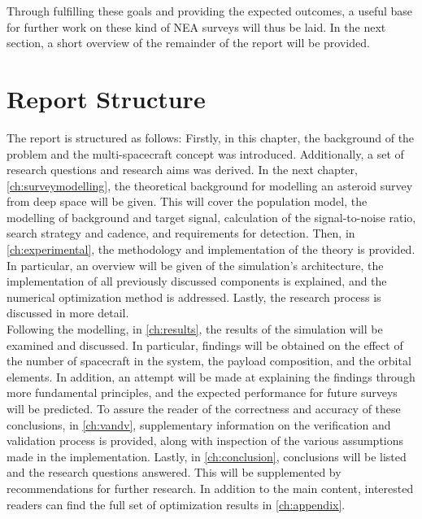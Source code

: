 Through fulfilling these goals and providing the expected outcomes, a useful base for further work on these kind of NEA surveys will thus be laid. In the next section, a short overview of the remainder of the report will be provided.

\section{Report Structure}
\label{sec:reportstructure}
The report is structured as follows: Firstly, in this chapter, the background of the problem and the multi-spacecraft concept was introduced. Additionally, a set of research questions and research aims was derived. In the next chapter, \autoref{ch:surveymodelling}, the theoretical background for modelling an asteroid survey from deep space will be given. This will cover the population model, the modelling of background and target signal, calculation of the signal-to-noise ratio, search strategy and cadence, and requirements for detection. Then, in \autoref{ch:experimental}, the methodology and implementation of the theory is provided. In particular, an overview will be given of the simulation's architecture, the implementation of all previously discussed components is explained, and the numerical optimization method is addressed. Lastly, the research process is discussed in more detail. \\

Following the modelling, in \autoref{ch:results}, the results of the simulation will be examined and discussed. In particular, findings will be obtained on the effect of the number of spacecraft in the system, the payload composition, and the orbital elements. In addition, an attempt will be made at explaining the findings through more fundamental principles, and the expected performance for future surveys will be predicted. To assure the reader of the correctness and accuracy of these conclusions, in \autoref{ch:vandv}, supplementary information on the verification and validation process is provided, along with inspection of the various assumptions made in the implementation. Lastly, in \autoref{ch:conclusion}, conclusions will be listed and the research questions answered. This will be supplemented by recommendations for further research. In addition to the main content, interested readers can find the full set of optimization results in \autoref{ch:appendix}.

